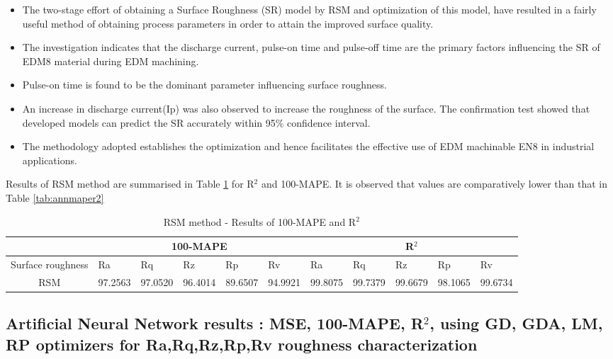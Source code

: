 \documentclass[suppldata]{interact}
\begin{document}
\begin {itemize}
\item The two-stage effort of obtaining a Surface Roughness (SR) model by RSM and optimization of this model,
have resulted in a fairly useful method of obtaining process parameters in order to attain the improved
surface quality.
\item  The investigation indicates that the discharge current, pulse-on time and pulse-off time are the primary factors influencing the SR of EDM8 material during EDM machining.
\item  Pulse-on time is found to be the dominant parameter influencing surface roughness.
\item An increase in discharge current(Ip) was also observed to increase the roughness of the surface. The confirmation test showed that developed models can predict the SR accurately within 95\% confidence interval.
\item  The methodology adopted establishes the optimization and hence facilitates the effective use of EDM machinable EN8 in industrial applications.
\end{itemize}
Results of RSM method are summarised in Table \ref{tab:rsmmaper2} for R$^2$ and 100-MAPE. It is observed that values are comparatively lower than that in Table \ref{tab:annmaper2}

\begin{table}[htbp]
   \caption{ RSM method - Results of 100-MAPE and R$^2$} 
    \hspace{-8em}
    \small
    \begin{tabular}{|c|l|l|l|l|l|l|l|l|l||l|}
    \hline
        ~ & \multicolumn{5}{c|}{100-MAPE}& \multicolumn{5}{c|}{R$^2$}  \\ \hline
         Surface roughness & Ra & Rq & Rz & Rp & Rv & Ra &    Rq & Rz & Rp & Rv \\ \hline
         RSM               & 97.2563 & 97.0520 & 96.4014 & 89.6507 & 94.9921 & 99.8075 & 99.7379 & 99.6679 & 98.1065 & 99.6734\\ \hline
    \end{tabular}
    \label{tab:rsmmaper2}
\end{table}
\subsection{Artificial Neural Network results : MSE, 100-MAPE, R$^2$, using GD, GDA, LM, RP optimizers for Ra,Rq,Rz,Rp,Rv roughness characterization }	
\end{document}
